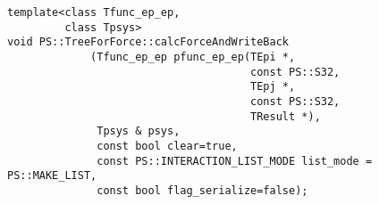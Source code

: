 
\begin{screen}
\begin{verbatim}
template<class Tfunc_ep_ep,
         class Tpsys>
void PS::TreeForForce::calcForceAndWriteBack
             (Tfunc_ep_ep pfunc_ep_ep(TEpi *,
                                      const PS::S32,
                                      TEpj *,
                                      const PS::S32,
                                      TResult *),
              Tpsys & psys,
              const bool clear=true,
              const PS::INTERACTION_LIST_MODE list_mode = PS::MAKE_LIST,
              const bool flag_serialize=false);
\end{verbatim}
\end{screen}


